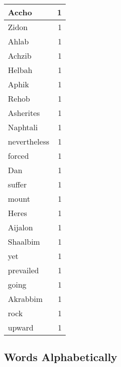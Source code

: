 \begin{center}
\begin{longtable}{l|r}
Accho & 1 \\ \hline
Zidon & 1 \\ \hline
Ahlab & 1 \\ \hline
Achzib & 1 \\ \hline
Helbah & 1 \\ \hline
Aphik & 1 \\ \hline
Rehob & 1 \\ \hline
Asherites & 1 \\ \hline
Naphtali & 1 \\ \hline
nevertheless & 1 \\ \hline
forced & 1 \\ \hline
Dan & 1 \\ \hline
suffer & 1 \\ \hline
mount & 1 \\ \hline
Heres & 1 \\ \hline
Aijalon & 1 \\ \hline
Shaalbim & 1 \\ \hline
yet & 1 \\ \hline
prevailed & 1 \\ \hline
going & 1 \\ \hline
Akrabbim & 1 \\ \hline
rock & 1 \\ \hline
upward & 1 \\ \hline
\end{longtable}
\end{center}



\normalsize



\subsection{Words Alphabetically}

